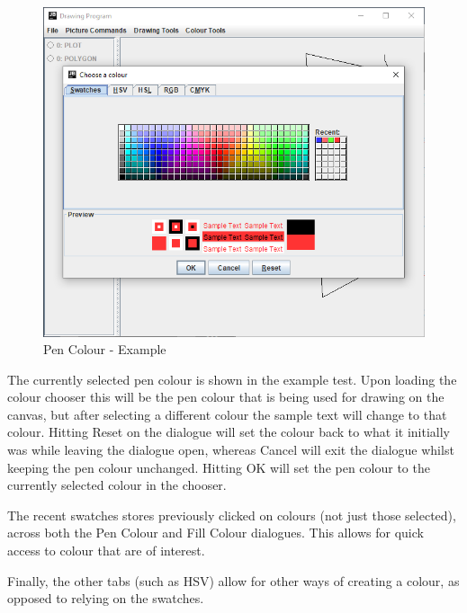\documentclass[12pt]{article} %
\begin{document}
\begin{figure}[H]
\caption{Pen Colour - Example}
\centering
\includegraphics[scale=0.75]{pictures/colourFirstWindow.PNG}
\end{figure}

The currently selected pen colour is shown in the example test. Upon loading the colour chooser this will be the pen colour that is being used for drawing on the canvas, but after selecting a different colour the sample text will change to that colour. Hitting Reset on the dialogue will set the colour back to what it initially was while leaving the dialogue open, whereas Cancel will exit the dialogue whilst keeping the pen colour unchanged. Hitting OK will set the pen colour to the currently selected colour in the chooser.

The recent swatches stores previously clicked on colours (not just those selected), across both the Pen Colour and Fill Colour dialogues. This allows for quick access to colour that are of interest.

Finally, the other tabs (such as HSV) allow for other ways of creating a colour, as opposed to relying on the swatches.
\end{document}
